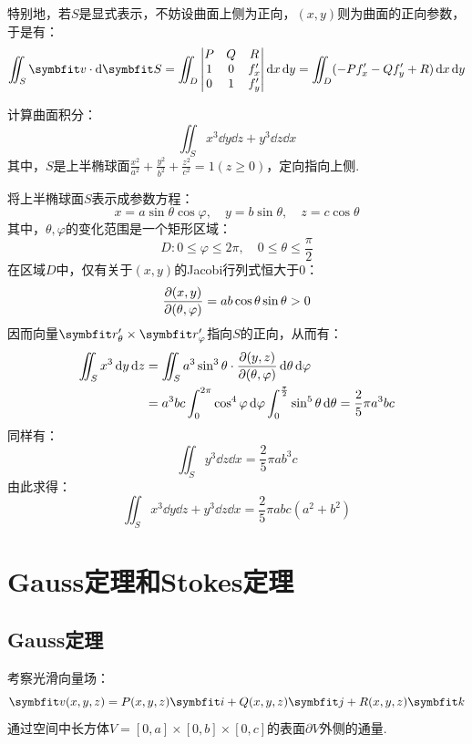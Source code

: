 特别地，若$S$是显式表示，不妨设曲面上侧为正向，$(x,y)$则为曲面的正向参数，于是有：
\[\iint_S \vb{v}\cdot\dd{\vb{S}} = \iint_D \begin{vmatrix}
    P & Q & R \\ 1 & 0 & f'_x \\ 0 & 1 & f'_y
\end{vmatrix}\dd{x}\dd{y} = \iint_D(-Pf'_x - Qf'_y + R)\dd{x}\dd{y}\]


\begin{question}
    计算曲面积分：
    \[\iint_S x^3\dd{y}\dd{z} + y^3\dd{z}\dd{x}\]
    其中，$S$是上半椭球面$\displaystyle\frac{x^2}{a^2}+\frac{y^2}{b^2}+\frac{z^2}{c^2} = 1(z\geqslant0)$，定向指向上侧.
\end{question}

\begin{solution}
    将上半椭球面$S$表示成参数方程：
    \[x = a\sin\theta\cos\varphi,\quad y = b\sin\theta,\quad z = c\cos\theta\]
    其中，$\theta,\varphi$的变化范围是一个矩形区域：
    \[D:0\leqslant\varphi\leqslant2\pi,\quad 0\leqslant\theta\leqslant\frac{\pi}{2}\]
    在区域$D$中，仅有关于$(x,y)$的Jacobi行列式恒大于$0$：
    \[\pdv{(x,y)}{(\theta,\varphi)} = ab\cos\theta\sin\theta > 0\]
    因而向量$\vb{r}'_\theta\times\vb{r}'_\varphi$指向$S$的正向，从而有：
    \begin{align*}
        \iint_S x^3\dd{y}\dd{z} &= \iint_S a^3\sin^3\theta\cdot\pdv{(y,z)}{(\theta,\varphi)}\dd{\theta}\dd{\varphi}\\
        &= a^3bc\int_{0}^{2\pi}\cos^4\varphi\dd{\varphi}\int_{0}^{\frac{\pi}{2}}\sin^5\theta\dd{\theta} = \frac{2}{5}\pi a^3bc
    \end{align*}
    同样有：
    \[\iint_S y^3\dd{z}\dd{x} = \frac{2}{5}\pi ab^3c\]
    由此求得：
    \[\iint_S x^3\dd{y}\dd{z} + y^3\dd{z}\dd{x} = \frac{2}{5}\pi abc(a^2+b^2)\]
\end{solution}


\section{Gauss定理和Stokes定理}
\subsection{Gauss定理}
考察光滑向量场：
\[\vb{v}(x,y,z) = P(x,y,z)\vb{i} + Q(x,y,z)\vb{j} + R(x,y,z)\vb{k}\]
通过空间中长方体$V = [0,a]\times[0,b]\times[0,c]$的表面$\partial V$外侧的通量.

